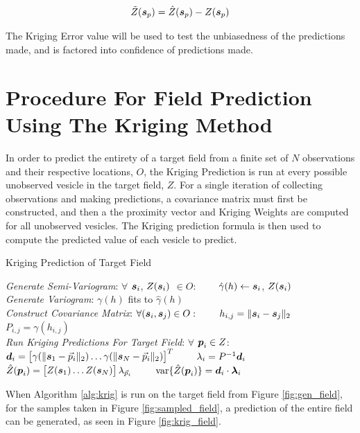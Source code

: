\begin{equation}
    \tilde{Z}({\it{\boldsymbol{s}}}_p) = \hat{Z}({\it{\boldsymbol{s}}}_p) - Z({\it{\boldsymbol{s}}}_p) 
    \label{eq:krigerr}
\end{equation}

\noindent The Kriging Error value will be used to test the unbiasedness of the predictions made, and is factored into confidence of predictions made.

\section{Procedure For Field Prediction Using The Kriging Method}
In order to predict the entirety of a target field from a finite set of $N$ observations and their respective locations, $O$, the Kriging Prediction is run at every possible unobserved vesicle in the target field, $Z$. For a single iteration of collecting observations and making predictions, a covariance matrix must first be constructed, and then a the proximity vector and Kriging Weights are computed for all unobserved vesicles. The Kriging prediction formula is then used to compute the predicted value of each vesicle to predict.

\begin{algorithm}[thpb!]
\caption{Kriging Prediction of Target Field}\label{alg:krig}
\begin{algorithmic}[1]
\BState \emph{Generate Semi-Variogram}:
\State $\forall$ ${\it{\boldsymbol{s}}}_i$, $Z({\it{\boldsymbol{s}}}_i)$ $\in O$:
\State \ \ \ \ $\hat{\gamma}(h) \gets {\it{\boldsymbol{s}}}_i$, $Z({\it{\boldsymbol{s}}}_i)$\\
\BState \emph{Generate Variogram}:
\State $\gamma(h)$ fits to $\hat{\gamma}(h)$\\
\BState \emph{Construct Covariance Matrix}:
\State $\forall ({\it{\boldsymbol{s}}}_i,{\it{\boldsymbol{s}}}_j) \in O:$
\State \ \ \ \ $h_{i,j} = \|{\it{\boldsymbol{s}}}_i - {\it{\boldsymbol{s}}}_j\|_2$
\State \ \ \ \ $P_{i,j} = \gamma(h_{i,j})$\\
\BState \emph{Run Kriging Predictions For Target Field}:
\State $\forall$ ${\it{\boldsymbol{p}}}_i \in Z$:
\State \ \ \ \ ${\it{\boldsymbol{d}}}_{i} = \begin{bmatrix} \gamma(\| {\it{\boldsymbol{s}}}_1 - \vec{p}_i \|_2) \dots \gamma(\| {\it{\boldsymbol{s}}}_N - \vec{p}_i \|_2) \end{bmatrix}^T$
\State \ \ \ \ $\lambda_{i} = P^{-1}{\it{\boldsymbol{d}}}_{i}$
\State \ \ \ \ $\hat{Z}({\it{\boldsymbol{p}}}_i) = \begin{bmatrix} Z({\it{\boldsymbol{s}}}_1) \dots Z({\it{\boldsymbol{s}}}_N) \end{bmatrix} \lambda_{\vec{p}_i}$
\State \ \ \ \ $\text{var}\{\hat{Z}({\it{\boldsymbol{p}}}_i)\} = {\it{\boldsymbol{d}}}_i \cdot {\it{\boldsymbol{\lambda}}}_i$
\EndProcedure
\end{algorithmic}
\end{algorithm}

When Algorithm \ref{alg:krig} is run on the target field from Figure \ref{fig:gen_field}, for the samples taken in Figure \ref{fig:sampled_field}, a prediction of the entire field can be generated, as seen in Figure \ref{fig:krig_field}.